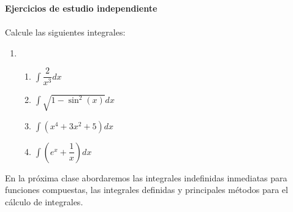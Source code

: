 \documentclass{article}
\begin{document}
{\bf Ejercicios de estudio independiente}\\ \\
Calcule las siguientes integrales:
\begin{enumerate}
	\item[]
	\begin{enumerate}
		\item $\displaystyle \int\dfrac{2}{x^3}dx$
		\item $\displaystyle \int\sqrt{1-\sin^2(x)}dx$
		\item $\displaystyle \int (x^4+3x^2+5)dx$
		\item $\displaystyle \int \left(e^x+\dfrac{1}{x}\right)dx$
	\end{enumerate}
\end{enumerate}

En la próxima clase abordaremos las integrales indefinidas inmediatas para funciones compuestas, las integrales definidas y principales métodos para el cálculo de integrales.
\end{document}
